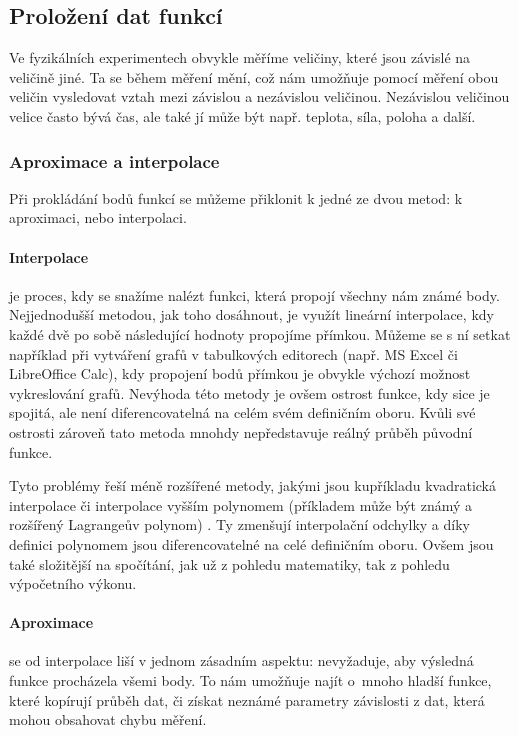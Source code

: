 \newcommand{\nsum}{\sum^n_{i=1}}
\newcommand{\nsumx}{\sum^n_{i=1}x_i}
\newcommand{\nsumy}{\sum^n_{i=1}y_i}
\newcommand{\nsumxx}{\sum^n_{i=1}x_i^2}
\newcommand{\nsumxy}{\sum^n_{i=1}x_iy_i}

\subsection{Proložení dat funkcí}
Ve fyzikálních experimentech obvykle měříme veličiny, které jsou závislé na
veličině jiné. Ta se během měření mění, což nám umožňuje pomocí měření obou
veličin vysledovat vztah mezi závislou a nezávislou veličinou. Nezávislou
veličinou velice často bývá čas, ale také jí může být např. teplota, síla,
poloha a další.\cite{praktikum}

\subsubsection{Aproximace a interpolace}
Při prokládání bodů funkcí se můžeme přiklonit k jedné ze dvou metod: k
aproximaci, nebo interpolaci.

\paragraph{Interpolace} je proces, kdy se snažíme nalézt funkci, která propojí
všechny nám známé body. Nejjednodušší metodou, jak toho dosáhnout, je využít
lineární interpolace, kdy každé dvě po sobě následující hodnoty propojíme
přímkou. Můžeme se s ní setkat například při vytváření grafů v tabulkových
editorech (např. MS Excel či LibreOffice Calc), kdy propojení bodů přímkou je
obvykle výchozí možnost vykreslování grafů. Nevýhoda této metody je ovšem
ostrost funkce, kdy sice je spojitá, ale není diferencovatelná na celém svém
definičním oboru. Kvůli své ostrosti zároveň tato metoda mnohdy nepředstavuje
reálný průběh původní funkce.

Tyto problémy řeší méně rozšířené metody, jakými jsou kupříkladu kvadratická
interpolace či interpolace vyšším polynomem (příkladem může být známý a
rozšířený Lagrangeův polynom) . Ty zmenšují interpolační odchylky a díky
definici polynomem jsou diferencovatelné na celé definičním oboru. Ovšem jsou
také složitější na spočítání, jak už z pohledu matematiky, tak z pohledu
výpočetního výkonu.

\paragraph{Aproximace} se od interpolace liší v jednom zásadním aspektu:
nevyžaduje, aby výsledná funkce procházela všemi body. To nám umožňuje najít
o~mnoho hladší funkce, které kopírují průběh dat, či získat neznámé parametry
závislosti z dat, která mohou obsahovat chybu měření. 

